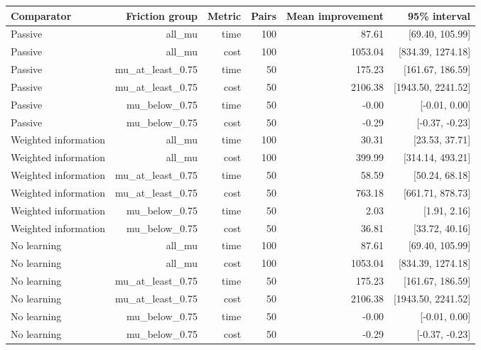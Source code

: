 \begin{tabular}{lrrrrr}
\toprule
Comparator & Friction group & Metric & Pairs & Mean improvement & 95\% interval \\
\midrule
Passive & all\_mu & time & 100 & 87.61 & [69.40, 105.99] \\
Passive & all\_mu & cost & 100 & 1053.04 & [834.39, 1274.18] \\
Passive & mu\_at\_least\_0.75 & time & 50 & 175.23 & [161.67, 186.59] \\
Passive & mu\_at\_least\_0.75 & cost & 50 & 2106.38 & [1943.50, 2241.52] \\
Passive & mu\_below\_0.75 & time & 50 & -0.00 & [-0.01, 0.00] \\
Passive & mu\_below\_0.75 & cost & 50 & -0.29 & [-0.37, -0.23] \\
Weighted information & all\_mu & time & 100 & 30.31 & [23.53, 37.71] \\
Weighted information & all\_mu & cost & 100 & 399.99 & [314.14, 493.21] \\
Weighted information & mu\_at\_least\_0.75 & time & 50 & 58.59 & [50.24, 68.18] \\
Weighted information & mu\_at\_least\_0.75 & cost & 50 & 763.18 & [661.71, 878.73] \\
Weighted information & mu\_below\_0.75 & time & 50 & 2.03 & [1.91, 2.16] \\
Weighted information & mu\_below\_0.75 & cost & 50 & 36.81 & [33.72, 40.16] \\
No learning & all\_mu & time & 100 & 87.61 & [69.40, 105.99] \\
No learning & all\_mu & cost & 100 & 1053.04 & [834.39, 1274.18] \\
No learning & mu\_at\_least\_0.75 & time & 50 & 175.23 & [161.67, 186.59] \\
No learning & mu\_at\_least\_0.75 & cost & 50 & 2106.38 & [1943.50, 2241.52] \\
No learning & mu\_below\_0.75 & time & 50 & -0.00 & [-0.01, 0.00] \\
No learning & mu\_below\_0.75 & cost & 50 & -0.29 & [-0.37, -0.23] \\
\bottomrule
\end{tabular}
